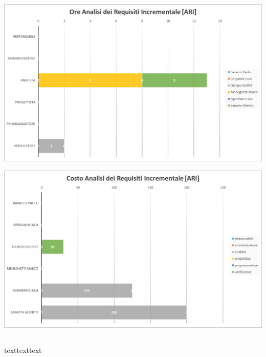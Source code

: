 	{\includegraphics[width=15cm]{img/oreari2.png}\par}

	{\includegraphics[width=15cm]{img/costoari.png}\par}


\subsection{\PA}
texttexttext

